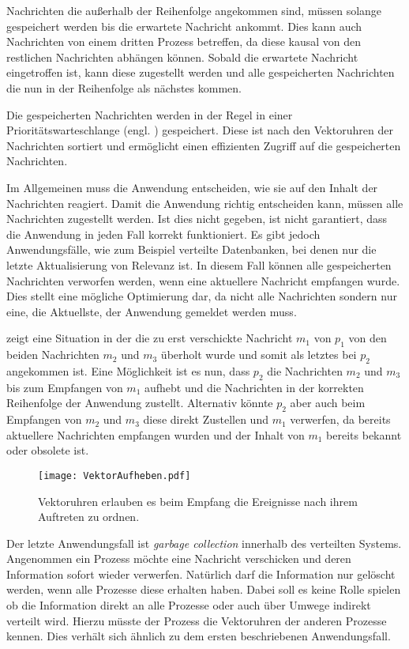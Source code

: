 Nachrichten die außerhalb der Reihenfolge angekommen sind, müssen solange gespeichert werden bis die erwartete Nachricht ankommt.
Dies kann auch Nachrichten von einem dritten Prozess betreffen, da diese kausal von den restlichen Nachrichten abhängen können.
Sobald die erwartete Nachricht eingetroffen ist, kann diese zugestellt werden und alle gespeicherten Nachrichten die nun in der Reihenfolge als nächstes kommen.

Die gespeicherten Nachrichten werden in der Regel in einer Prioritätswarteschlange (engl. ) gespeichert.
Diese ist nach den Vektoruhren der Nachrichten sortiert und ermöglicht einen effizienten Zugriff auf die gespeicherten Nachrichten.

Im Allgemeinen muss die Anwendung entscheiden, wie sie auf den Inhalt der Nachrichten reagiert.
Damit die Anwendung richtig entscheiden kann, müssen alle Nachrichten zugestellt werden.
Ist dies nicht gegeben, ist nicht garantiert, dass die Anwendung in jeden Fall korrekt funktioniert.
Es gibt jedoch Anwendungsfälle, wie zum Beispiel verteilte Datenbanken, bei denen nur die letzte Aktualisierung von Relevanz ist.
In diesem Fall können alle gespeicherten Nachrichten verworfen werden, wenn eine aktuellere Nachricht empfangen wurde.
Dies stellt eine mögliche Optimierung dar, da nicht alle Nachrichten sondern nur eine, die Aktuellste, der Anwendung gemeldet werden muss.

 zeigt eine Situation in der die zu erst verschickte Nachricht $m_1$ von $p_1$ von den beiden Nachrichten $m_2$ und $m_3$ überholt wurde und somit als letztes bei $p_2$ angekommen ist.
Eine Möglichkeit ist es nun, dass $p_2$ die Nachrichten $m_2$ und $m_3$ bis zum Empfangen von $m_1$ aufhebt und die Nachrichten in der korrekten Reihenfolge der Anwendung zustellt.
Alternativ könnte $p_2$ aber auch beim Empfangen von $m_2$ und $m_3$ diese direkt Zustellen und $m_1$ verwerfen, da bereits aktuellere Nachrichten empfangen wurden und der Inhalt von $m_1$ bereits bekannt oder obsolete ist.

\begin{figure}[ht]
    \centering
    \texttt{[image: VektorAufheben.pdf]}
    \caption[Aufheben alter Nachrichten]{Vektoruhren erlauben es beim Empfang die Ereignisse nach ihrem Auftreten zu ordnen.}
    \label{fig:vecaufheben}
\end{figure}

Der letzte Anwendungsfall ist \textit{garbage collection} innerhalb des verteilten Systems.
Angenommen ein Prozess möchte eine Nachricht verschicken und deren Information sofort wieder verwerfen.
Natürlich darf die Information nur gelöscht werden, wenn alle Prozesse diese erhalten haben.
Dabei soll es keine Rolle spielen ob die Information direkt an alle Prozesse oder auch über Umwege indirekt verteilt wird.
Hierzu müsste der Prozess die Vektoruhren der anderen Prozesse kennen.
Dies verhält sich ähnlich zu dem ersten beschriebenen Anwendungsfall.

